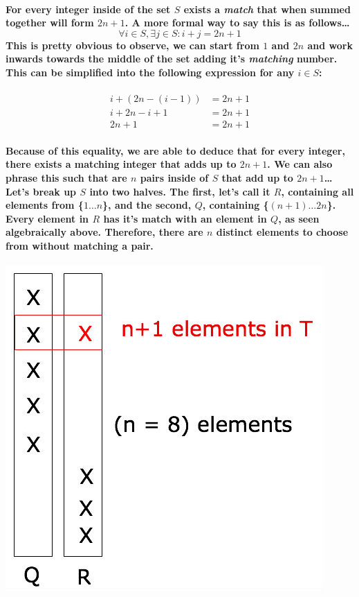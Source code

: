 \documentclass{amsart}
\theoremstyle{definition}
\theoremstyle{remark}
\numberwithin{equation}{section}
\begin{document}
\paragraph{
\newline
	For every integer inside of the set $S$ exists a \textit{match} that when summed together will form $2n+1$. A more formal way to say this is as follows\dots\newline$$\forall i\in S, \exists j\in S: i + j = 2n+1$$This is pretty obvious to observe, we can start from $1$ and $2n$ and work inwards towards the middle of the set adding it's \textit{matching} number. This can be simplified into the following expression for any $i \in S$: 
}

\begin{align}
	i + (2n - (i - 1)) &= 2n + 1 \\
	i + 2n - i + 1 &= 2n + 1 \\
	2n + 1 &= 2n + 1
\end{align}

\paragraph{
	Because of this equality, we are able to deduce that for every integer, there exists a matching integer that adds up to $2n+1$. We can also phrase this such that are $n$ pairs inside of $S$ that add up to $2n+1$\dots\newline Let's break up $S$ into two halves. The \textbf{first}, let's call it $R$, containing all elements from \{$1\dots n$\}, and the \textbf{second}, $Q$, containing \{$(n+1) \dots 2n$\}. Every element in $R$ has it's match with an element in $Q$, as seen algebraically above. Therefore, there are $n$ distinct elements to choose from without matching a pair.\newline
}
\includegraphics[scale=0.3]{Untitled.jpg}
\end{document}
